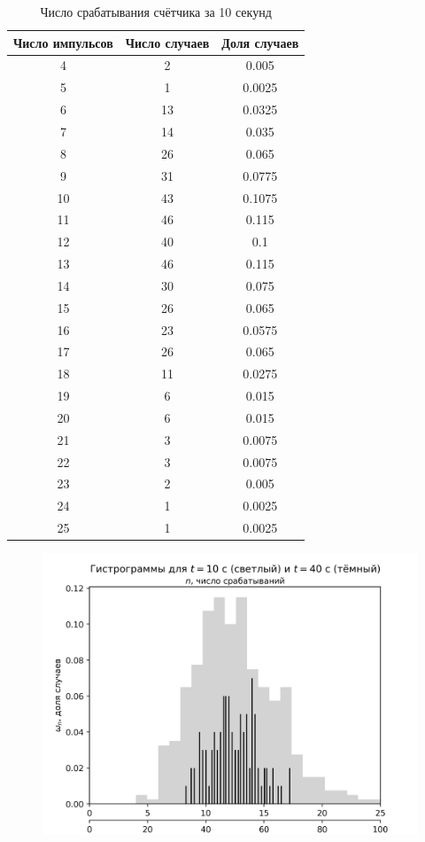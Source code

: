 \begin{table}
    \centering
    \caption{Число срабатывания счётчика за 10 секунд}
    \begin{tabular}{|c|c|c|}
    \hline
        Число импульсов & Число случаев & Доля случаев \\ \hline
        4 & 2 & 0.005 \\ \hline
        5 & 1 & 0.0025 \\ \hline
        6 & 13 & 0.0325 \\ \hline
        7 & 14 & 0.035 \\ \hline
        8 & 26 & 0.065 \\ \hline
        9 & 31 & 0.0775 \\ \hline
        10 & 43 & 0.1075 \\ \hline
        11 & 46 & 0.115 \\ \hline
        12 & 40 & 0.1 \\ \hline
        13 & 46 & 0.115 \\ \hline
        14 & 30 & 0.075 \\ \hline
        15 & 26 & 0.065 \\ \hline
        16 & 23 & 0.0575 \\ \hline
        17 & 26 & 0.065 \\ \hline
        18 & 11 & 0.0275 \\ \hline
        19 & 6 & 0.015 \\ \hline
        20 & 6 & 0.015 \\ \hline
        21 & 3 & 0.0075 \\ \hline
        22 & 3 & 0.0075 \\ \hline
        23 & 2 & 0.005 \\ \hline
        24 & 1 & 0.0025 \\ \hline
        25 & 1 & 0.0025 \\ \hline
    \end{tabular}
    \label{table:3}
\end{table}

\begin{figure}
    \centering
    \includegraphics{jupiter/lol.png}
\end{figure}

